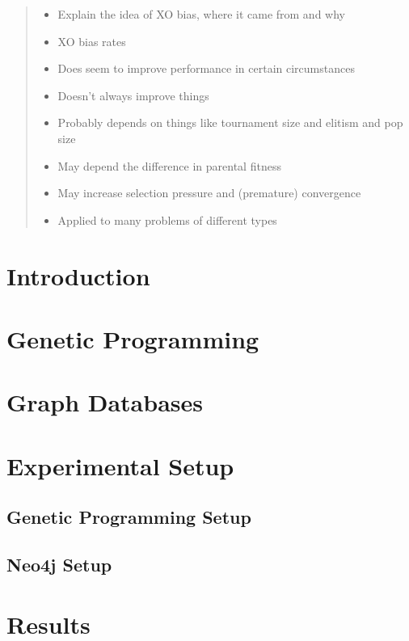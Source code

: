 \documentclass[12pt]{article}
\begin{document}
\begin{abstract}
\begin{itemize}
	\item Explain the idea of XO bias, where it came from and why
	\item XO bias rates
	\item Does seem to improve performance in certain circumstances
	\item Doesn't always improve things
	\item Probably depends on things like tournament size and elitism and pop size
		\item May depend the difference in parental fitness
	\item May increase selection pressure and (premature) convergence
	\item Applied to many problems of different types
\end{itemize}

\end{abstract}

\section{Introduction} \label{Introduction}

\section{Genetic Programming} \label{Genetic Programming}

\section{Graph Databases} \label{Graph Databases}

\section{Experimental Setup} \label{Experiments}

\subsection{Genetic Programming Setup} \label{Genetic Programming Setup}

\subsection{Neo4j Setup} \label{Neo4j Setup}

\section{Results} \label{Results}
\end{document}
